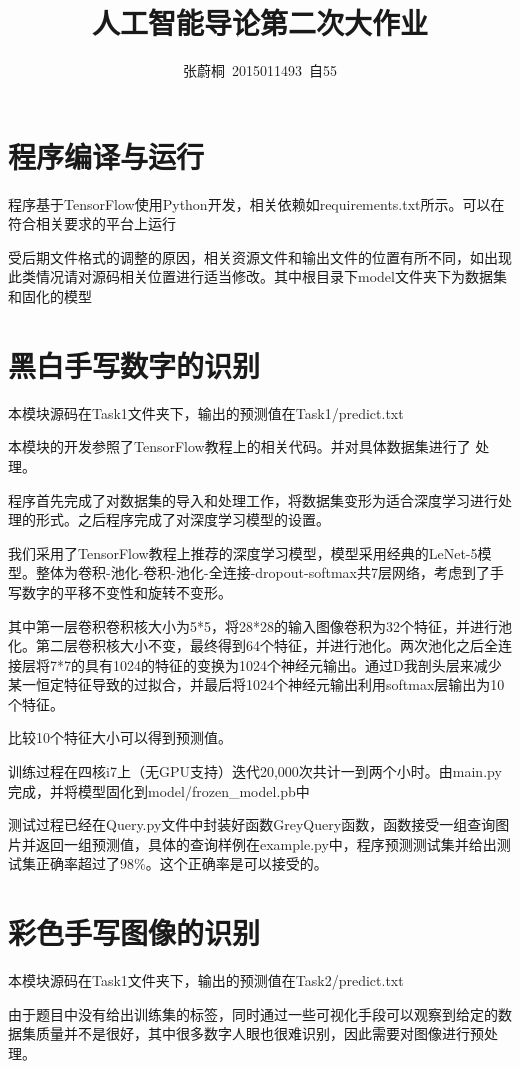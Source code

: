 \documentclass[UTF8,a4paper]{paper}
\title{人工智能导论第二次大作业}
\author{张蔚桐\ 2015011493\ 自55}
\begin{document}
\maketitle
\section{程序编译与运行}
程序基于TensorFlow使用Python开发，相关依赖如requirements.txt所示。可以在符合相关要求的平台上运行

受后期文件格式的调整的原因，相关资源文件和输出文件的位置有所不同，如出现此类情况请对源码相关位置进行适当修改。其中根目录下model文件夹下为数据集和固化的模型

\section{黑白手写数字的识别}
本模块源码在Task1文件夹下，输出的预测值在Task1/predict.txt

本模块的开发参照了TensorFlow教程上的相关代码。并对具体数据集进行了
处理。

程序首先完成了对数据集的导入和处理工作，将数据集变形为适合深度学习进行处理的形式。之后程序完成了对深度学习模型的设置。

我们采用了TensorFlow教程上推荐的深度学习模型，模型采用经典的LeNet-5模型。整体为卷积-池化-卷积-池化-全连接-dropout-softmax共7层网络，考虑到了手写数字的平移不变性和旋转不变形。

其中第一层卷积卷积核大小为5*5，将28*28的输入图像卷积为32个特征，并进行池化。第二层卷积核大小不变，最终得到64个特征，并进行池化。两次池化之后全连接层将7*7的具有1024的特征的变换为1024个神经元输出。通过D我剖头层来减少某一恒定特征导致的过拟合，并最后将1024个神经元输出利用softmax层输出为10个特征。

比较10个特征大小可以得到预测值。

训练过程在四核i7上（无GPU支持）迭代20,000次共计一到两个小时。由main.py完成，并将模型固化到model/frozen\_model.pb中

测试过程已经在Query.py文件中封装好函数GreyQuery函数，函数接受一组查询图片并返回一组预测值，具体的查询样例在example.py中，程序预测测试集并给出测试集正确率超过了98\%。这个正确率是可以接受的。

\section{彩色手写图像的识别}
本模块源码在Task1文件夹下，输出的预测值在Task2/predict.txt

由于题目中没有给出训练集的标签，同时通过一些可视化手段可以观察到给定的数据集质量并不是很好，其中很多数字人眼也很难识别，因此需要对图像进行预处理。
\end{document}
